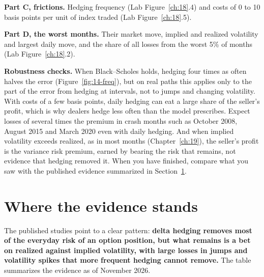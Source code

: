 \textbf{Part C, frictions.} Hedging frequency (Lab Figure~\ref{ch:18}.4) and costs of 0 to 10 basis points per unit of index traded (Lab Figure~\ref{ch:18}.5).

\textbf{Part D, the worst months.} Their market move, implied and realized volatility and largest daily move, and the share of all losses from the worst 5\% of months (Lab Figure~\ref{ch:18}.2).

\label{sec:14-stress}
\textbf{Robustness checks.} When Black--Scholes holds, hedging four times as often halves the error (Figure~\ref{fig:14-freq}), but on real paths this applies only to the part of the error from hedging at intervals, not to jumps and changing volatility. With costs of a few basis points, daily hedging can eat a large share of the seller's profit, which is why dealers hedge less often than the model prescribes. Expect losses of several times the premium in crash months such as October 2008, August 2015 and March 2020 even with daily hedging. And when implied volatility exceeds realized, as in most months (Chapter~\ref{ch:19}), the seller's profit is the variance risk premium, earned by bearing the risk that remains, not evidence that hedging removed it. When you have finished, compare what you saw with the published evidence summarized in Section~\ref{sec:14-verdict}.

\section{Where the evidence stands}
\label{sec:14-verdict}

The published studies point to a clear pattern: \textbf{delta hedging removes most of the everyday risk of an option position, but what remains is a bet on realized against implied volatility, with large losses in jumps and volatility spikes that more frequent hedging cannot remove.} The table summarizes the evidence as of November 2026.

